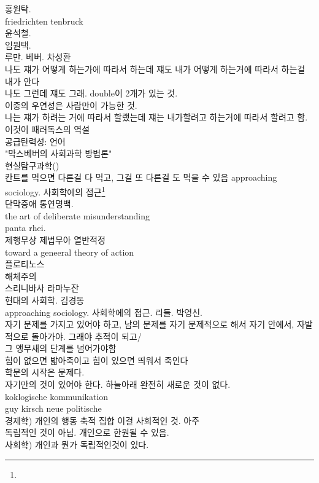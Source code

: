 \documentclass[11pt, a4paper]{article}
\begin{document}
홍원탁. \\
friedrichten tenbruck\\
윤석철.\\
임원택.\\
루만. 베버. 차성환\\
나도 쟤가 어떻게 하는가에 따라서 하는데 쟤도 내가 어떻게 하는거에 따라서 하는걸 내가 안다\\
나도 그런데 쟤도 그래. double이 2개가 있는 것.\\
이중의 우연성은 사람만이 가능한 것. \\
나는 쟤가 하려는 거에 따라서 할랬는데 쟤는 내가할려고 하는거에 따라서 할려고 함. 이것이 패러독스의 역설\\
공급탄력성: 언어\\
"막스베버의 사회과학 방법론"\\
현실탐구과학()\\
칸트를 먹으면 다른걸 다 먹고, 그걸 또 다른걸 도 먹을 수 있음
approaching sociology. 사회학에의 접근\footnote{}\\
단막증애 통연명백.\\
the art of deliberate misunderstanding\\
panta rhei.\\
제행무상 제법무아 열반적정\\
toward a geneeral theory of action\\
플로티노스\\
해체주의\\
스리니바사 라마누잔\\
현대의 사회학. 김경동\\
approaching sociology. 사회학에의 접근. 리들. 박영신.\\
자기 문제를 가지고 있어야 하고, 남의 문제를 자기 문제적으로 해서 자기 안에서, 자발적으로 돌아가야. 그래야 추적이 되고/\\ 그 앵무새의 단계를 넘어가야함\\
힘이 없으면 밟아죽이고 힘이 있으면 띄워서 죽인다\\
학문의 시작은 문제다. \\
자기만의 것이 있어야 한다. 하늘아래 완전히 새로운 것이 없다.\\ koklogische kommunikation\\
guy kirsch neue politische \\
경제학) 개인의 행동 축적 집합 이걸 사회적인 것. 아주\\ 독립적인 것이 아님. 개인으로 한원될 수 있음.\\
사회학) 개인과 뭔가 독립적인것이 있다.\\
\end{document}
